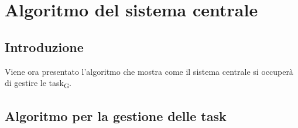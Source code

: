 \section{Algoritmo del sistema centrale}
\subsection{Introduzione}
Viene ora presentato l'algoritmo che mostra come il sistema centrale si occuperà di gestire le \gls{task}\textsubscript{G}.
\subsection{Algoritmo per la gestione delle task}

